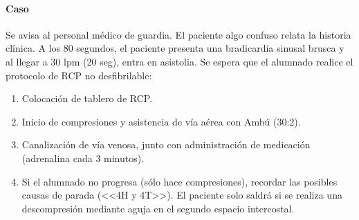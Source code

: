\paragraph{Caso} Se avisa al personal médico de guardia. El paciente algo confuso relata la historia clínica. A los 80 segundos, el paciente presenta una bradicardia sinusal brusca y al llegar a 30 lpm (20 seg), entra en asistolia. Se espera que el alumnado realice el protocolo de RCP no desfibrilable:
\begin{enumerate}[topsep=0pt, partopsep=0pt,itemsep=0pt,parsep=0pt]
    \item Colocación de tablero de RCP.
    \item Inicio de compresiones y asistencia de vía aérea con Ambú (30:2).
    \item Canalización de vía venosa, junto con administración de medicación (adrenalina cada 3 minutos).
    \item Si el alumnado no progresa (sólo hace compresiones), recordar las posibles causas de parada (<<4H y 4T>>). El paciente solo saldrá si se realiza una descompresión mediante aguja en el segundo espacio intercostal.
\end{enumerate}
\vspace{-12.5pt}
